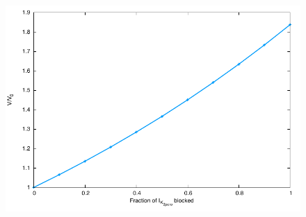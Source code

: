 \clearpage
\begin{landscape}
\begin{figure}
  \centering
  \includegraphics[width=1.0\textwidth]
    {../results/pdf/20120803/cell_swelling_homeostasis}
  \caption{}
  \label{fig:cell_swelling_homeostasis}
\end{figure}
\end{landscape}

